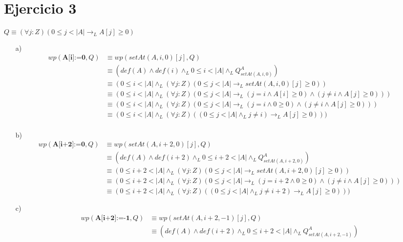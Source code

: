 \documentclass{article}
\begin{document}
\section*{Ejercicio 3}
$Q \equiv (\forall j :Z)(0 \leq j < |A| \to_L A[j] \geq 0)$
\normalsize{{\begin{itemize}
    \item [a) ]
    \setcounter{equation}{0}
    \begin{align}
        wp(\textbf{A[i]:=0},Q)&\equiv wp(setAt(A,i,0)[j],Q)\\
        &\equiv (def(A) \land def(i) \land_L 0\leq i <|A| \land_L Q^A_{setAt(A,i,0)})\\
        &\equiv (0\leq i <|A| \land_L (\forall j :Z)(0 \leq j < |A| \to_L setAt(A,i,0)[j] \geq 0) )\\
        &\equiv (0\leq i <|A| \land_L (\forall j :Z)(0 \leq j < |A| \to_L (j=i \land A[i]\geq0) \land (j\neq i \land A[j]\geq0) ))\\
        &\equiv (0\leq i <|A| \land_L (\forall j :Z)(0 \leq j < |A| \to_L (j=i \land 0\geq0) \land (j\neq i \land A[j]\geq0) ))\\
        &\equiv (0\leq i <|A| \land_L (\forall j :Z)((0 \leq j < |A| \land_L j\neq i) \to_L A[j]\geq0) ))\\
    \end{align}
    \item [b) ]
    \setcounter{equation}{0}
    \begin{align}
        wp(\textbf{A[i+2]:=0},Q)&\equiv wp(setAt(A,i+2,0)[j],Q)\\
        &\equiv (def(A) \land def(i+2) \land_L 0\leq i+2 <|A| \land_L Q^A_{setAt(A,i+2,0)})\\
        &\equiv (0\leq i+2 <|A| \land_L (\forall j :Z)(0 \leq j < |A| \to_L setAt(A,i+2,0)[j] \geq 0) )\\
        &\equiv (0\leq i+2 <|A| \land_L (\forall j :Z)(0 \leq j < |A| \to_L (j=i+2 \land 0\geq0) \land (j\neq i \land A[j]\geq0) ))\\
        &\equiv (0\leq i+2 <|A| \land_L (\forall j :Z)((0 \leq j < |A| \land_L j\neq i+2) \to_L A[j]\geq0) ))
    \end{align}
    \item [c) ]
    \setcounter{equation}{0}
    \begin{align}
        wp(\textbf{A[i+2]:=-1},Q)&\equiv wp(setAt(A,i+2,-1)[j],Q)\\
        &\equiv (def(A) \land def(i+2) \land_L 0\leq i+2 <|A| \land_L Q^A_{setAt(A,i+2,-1)})\\

\end{align}
\end{itemize}}}
\end{document}
